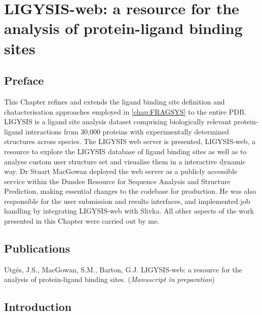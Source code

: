 \chapter{LIGYSIS-web: a resource for the analysis of protein-ligand binding sites}
\label{chap:LIGYSIS_WEB}

\section*{Preface}

This Chapter refines and extends the ligand binding site definition and chatacterisation approaches employed in \autoref{chap:FRAGSYS} to the entire PDB. LIGYSIS is a ligand site analysis dataset comprising biologically relevant protein-ligand interactions from 30,000 proteins with experimentally determined structures across species. The LIGYSIS web server is presented, LIGYSIS-web, a resource to explore the LIGYSIS database of ligand binding sites as well as to analyse custom user structure set and visualise them in a interactive dynamic way. Dr Stuart MacGowan deployed the web server as a publicly accessible service within the Dundee Resource for Sequence Analysis and Structure Prediction, making essential changes to the codebase for production. He was also responsible for the user submission and results interfaces, and implemented job handling by integrating LIGYSIS-web with Slivka. All other aspects of the work presented in this Chapter were carried out by me.

\section*{Publications}

Utgés, J.S., MacGowan, S.M., Barton, G.J. LIGYSIS-web: a resource for the analysis of protein-ligand binding sites. (\textit{Manuscript in preparation})



\section{Introduction}

